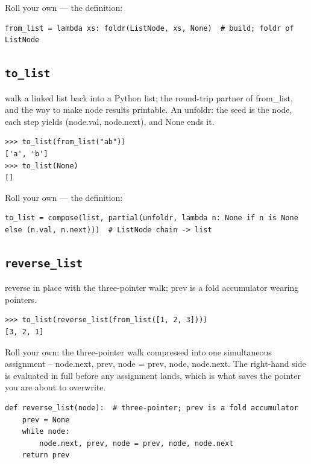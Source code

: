 \documentclass[10pt,letterpaper]{book}
\begin{document}
Roll your own --- the definition:

\begin{lstlisting}[style=ex]
from_list = lambda xs: foldr(ListNode, xs, None)  # build; foldr of ListNode
\end{lstlisting}

\subsection{\texttt{to\_list}}\label{def:to-list}
walk a linked list back into a Python list; the round-trip partner of from\_list, and the way to make node results printable. An unfoldr: the seed is the node, each step yields (node.val, node.next), and None ends it.
\begin{lstlisting}[style=ex]
>>> to_list(from_list("ab"))
['a', 'b']
>>> to_list(None)
[]
\end{lstlisting}

Roll your own --- the definition:

\begin{lstlisting}[style=ex]
to_list = compose(list, partial(unfoldr, lambda n: None if n is None else (n.val, n.next)))  # ListNode chain -> list
\end{lstlisting}

\subsection{\texttt{reverse\_list}}\label{def:reverse-list}
reverse in place with the three-pointer walk; prev is a fold accumulator wearing pointers.
\begin{lstlisting}[style=ex]
>>> to_list(reverse_list(from_list([1, 2, 3])))
[3, 2, 1]
\end{lstlisting}

Roll your own: the three-pointer walk compressed into one simultaneous assignment -- node.next, prev, node = prev, node, node.next. The right-hand side is evaluated in full before any assignment lands, which is what saves the pointer you are about to overwrite.

\begin{lstlisting}[style=ex]
def reverse_list(node):  # three-pointer; prev is a fold accumulator
    prev = None
    while node:
        node.next, prev, node = prev, node, node.next
    return prev
\end{lstlisting}
\end{document}
